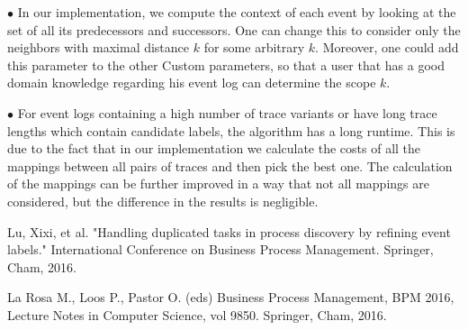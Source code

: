 \documentclass[notitlepage]{article}
\begin{document}
\begin{flushleft}
$\bullet$
In our implementation, we compute the context of each event by looking at the set of all its predecessors and successors.
One can change this to consider only the neighbors with maximal distance $k$ for some arbitrary $k$.
Moreover, one could add this parameter to the other Custom parameters, so that a user that has a good domain knowledge regarding his event log can determine the scope $k$.
\medskip

$\bullet$
For event logs containing a high number of trace variants or have long trace lengths which contain candidate labels, the algorithm has a long runtime.
This is due to the fact that in our implementation we calculate the costs of all the mappings between all pairs of traces and then pick the best one.
The calculation of the mappings can be further improved in a way that not all mappings are considered, but the difference in the results is negligible.

\end{flushleft}
%




\begin{thebibliography}{5}
Lu, Xixi, et al. "Handling duplicated tasks in process discovery by refining event labels." International Conference on Business Process Management. Springer, Cham, 2016.

\bibitem{}
La Rosa M., Loos P., Pastor O. (eds) Business Process Management, BPM 2016, Lecture Notes in Computer Science, vol 9850. Springer, Cham, 2016.






\end{thebibliography}
\end{document}
